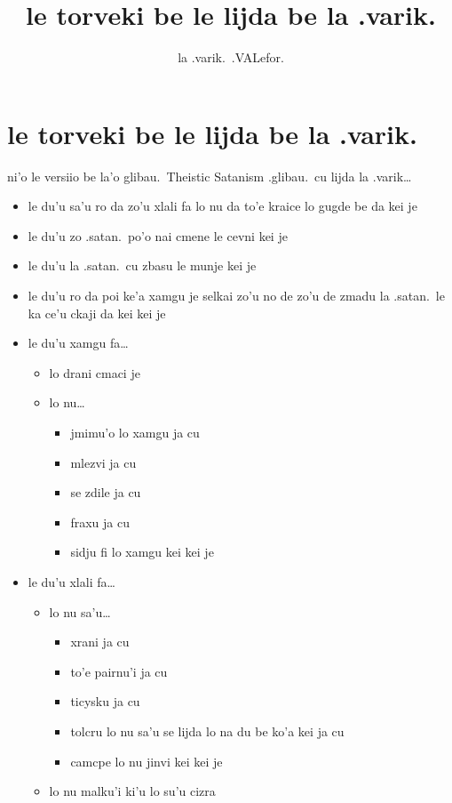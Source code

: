 \documentclass{article}
\title{le torveki be le lijda be la .varik.}
\author{la .varik.\ .VALefor.}
\begin{document}
\maketitle

\section{le torveki be le lijda be la .varik.}

ni'o le versiio be la'o glibau.\ Theistic Satanism .glibau.\ cu lijda la .varik\ldots

\begin{itemize}
	\item le du'u sa'u ro da zo'u xlali fa lo nu da to'e kraice lo gugde be da kei je
	\item le du'u zo .satan.\ po'o nai cmene le cevni kei je
	\item le du'u la .satan.\ cu zbasu le munje kei je
	\item le du'u ro da poi ke'a xamgu je selkai zo'u no de zo'u de zmadu la .satan.\ le ka ce'u ckaji da kei kei je
	\item le du'u xamgu fa\ldots{}
	\begin{itemize}
		\item lo drani cmaci je
		\item lo nu\ldots{}
		\begin{itemize}
			\item jmimu'o lo xamgu ja cu
			\item mlezvi ja cu
			\item se zdile ja cu
			\item fraxu ja cu
			\item sidju fi lo xamgu kei kei je
		\end{itemize}
	\end{itemize}
	\item le du'u xlali fa\ldots{}
	\begin{itemize}
		\item lo nu sa'u\ldots{}
		\begin{itemize}
			\item xrani ja cu
			\item to'e pairnu'i ja cu
			\item ticysku ja cu
			\item tolcru lo nu sa'u se lijda lo na du be ko'a kei ja cu
			\item camcpe lo nu jinvi kei kei je
		\end{itemize}
                \item lo nu malku'i ki'u lo su'u cizra
	\end{itemize}
\end{itemize}
\end{document}
